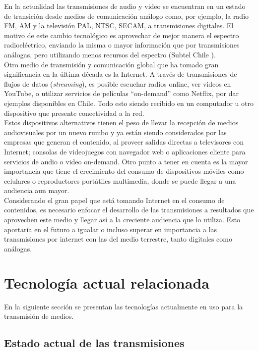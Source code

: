 En la actualidad las transmisiones de audio y video se encuentran en un estado de transición desde medios de comunicación análogo como, por ejemplo, la radio FM, AM y la televisión PAL, NTSC, SECAM, a transmisiones digitales. El motivo de este cambio tecnológico es aprovechar de mejor manera el espectro radioeléctrico, enviando la misma o mayor información que por transmisiones análogas, pero utilizando menos recursos del espectro (Subtel Chile \cite{sota:subtel}).\\

Otro medio de transmisión y comunicación global que ha tomado gran significancia en la última década es la Internet. A través de transmisiones de flujos de datos (\textit{streaming}), es posible escuchar radios online, ver videos en YouTube, o utilizar servicios de películas “on-demand” como Netflix, por dar ejemplos disponibles en Chile. Todo esto siendo recibido en un computador u otro dispositivo que presente conectividad a la red.\\

Estos dispositivos alternativos tienen el peso de llevar la recepción de medios audiovisuales por un nuevo rumbo y ya están siendo considerados por las empresas que generan el contenido, al proveer salidas directas a televisores con Internet; consolas de videojuegos con navegador web o aplicaciones cliente para servicios de audio o video on-demand. Otro punto a tener en cuenta es la mayor importancia que tiene el crecimiento del consumo de dispositivos móviles como celulares o reproductores portátiles multimedia, donde se puede llegar a una audiencia aun mayor.\\

Considerando el gran papel que está tomando Internet en el consumo de contenidos, es necesario enfocar el desarrollo de las transmisiones a resultados que aprovechen este medio y llegar así a la creciente audiencia que lo utiliza. 
Esto aportaría en el futuro a igualar o incluso superar en importancia a las transmisiones por internet con las del medio terrestre, tanto digitales como análogas.

\clearpage
\section{Tecnología actual relacionada}
En la siguiente sección se presentan las tecnologías actualmente en uso para la transmisión de medios.

\subsection{Estado actual de las transmisiones}

